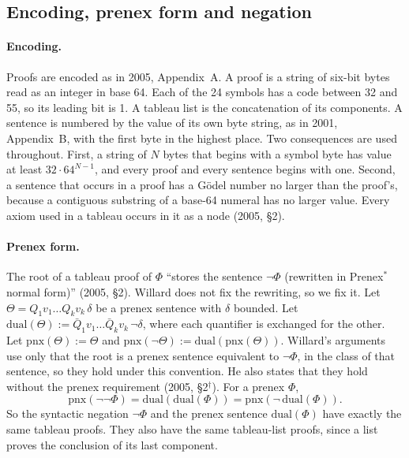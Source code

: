 \documentclass[11pt]{article}
\newcommand{\sk}{\ensuremath{^\dagger}}    %
\theoremstyle{plain}
\theoremstyle{definition}
\begin{document}
\subsection{Encoding, prenex form and negation}

\paragraph{Encoding.} Proofs are encoded as in 2005, Appendix~A. A proof is a
string of six-bit bytes read as an integer in base 64. Each of the 24 symbols
has a code between 32 and 55, so its leading bit is 1. A tableau list is the
concatenation of its components. A sentence is numbered by the value of its
own byte string, as in 2001, Appendix~B, with the first byte in the highest
place. Two consequences are used throughout. First, a string of $N$ bytes that
begins with a symbol byte has value at least $32 \cdot 64^{N-1}$, and every
proof and every sentence begins with one. Second, a sentence that occurs in a
proof has a Gödel number no larger than the proof's, because a contiguous
substring of a base-64 numeral has no larger value. Every axiom used in a
tableau occurs in it as a node (2005, \S2).

\paragraph{Prenex form.} The root of a tableau proof of $\Phi$ ``stores the
sentence $\neg\Phi$ (rewritten in Prenex$^*$ normal form)'' (2005, \S2).
Willard does not fix the rewriting, so we fix it. Let
$\Theta = Q_1v_1\ldots Q_kv_k\,\delta$ be a prenex sentence with $\delta$
bounded. Let $\mathrm{dual}(\Theta) := \bar Q_1v_1\ldots\bar Q_kv_k\,
\neg\delta$, where each quantifier is exchanged for the other. Let
$\mathrm{pnx}(\Theta) := \Theta$ and
$\mathrm{pnx}(\neg\Theta) := \mathrm{dual}(\mathrm{pnx}(\Theta))$. Willard's
arguments use only that the root is a prenex sentence equivalent to
$\neg\Phi$, in the class of that sentence, so they hold under this convention.
He also states that they hold without the prenex requirement (2005, \S2\sk).
For a prenex $\Phi$,
\[
\mathrm{pnx}(\neg\neg\Phi) = \mathrm{dual}(\mathrm{dual}(\Phi)) =
\mathrm{pnx}(\neg\,\mathrm{dual}(\Phi)).
\]
So the syntactic negation $\neg\Phi$ and the prenex sentence
$\mathrm{dual}(\Phi)$ have exactly the same tableau proofs. They also have the
same tableau-list proofs, since a list proves the conclusion of its last
component.
\end{document}
